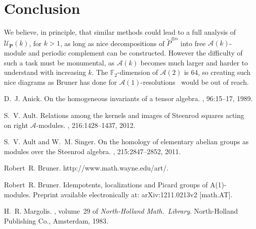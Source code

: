 \documentclass{amsart}
\theoremstyle{plain}
\theoremstyle{definition}
\theoremstyle{remark}
\begin{document}
\section{Conclusion}

We believe, in principle, that similar methods could lead to a full
analysis of $\mathcal{U}_{\mathbf{P}}(k)$, for $k > 1$, as long as
nice decompositions of $\widetilde{P}^{\otimes n}$ into free
$\mathcal{A}(k)$-module and periodic complement can be constructed.
However the difficulty of such a task must be monumental, as
$\mathcal{A}(k)$ becomes much larger and harder to understand with
increasing $k$.  The ${\mathbb{F}}_2$-dimension of $\mathcal{A}(2)$ is $64$, so
creating such nice diagrams as Bruner has done for
$\mathcal{A}(1)$-resolutions~\cite{Bruner_diagrams} would be out of
reach.



\begin{thebibliography}{1}

D.~J. Anick.
\newblock On the homogeneous invariants of a tensor algebra.
, 96:15--17, 1989.

S.~V. Ault.
\newblock Relations among the kernels and images of {S}teenrod squares acting
  on right $\mathcal{A}$-modules.
, 216:1428--1437, 2012.

S.~V. Ault and W.~M. Singer.
\newblock On the homology of elementary abelian groups as modules over the
  {S}teenrod algebra.
, 215:2847--2852, 2011.

Robert~R. Bruner.
\newblock http://www.math.wayne.edu/art/.

Robert~R. Bruner.
\newblock Idempotents, localizations and {P}icard groups of {A}(1)-modules.
\newblock Preprint available electronically at: arXiv:1211.0213v2 [math.AT].

H.~R. Margolis.
, volume~29 of {\em
  North-Holland Math.~Library}.
\newblock North-Holland Publishing Co., Amsterdam, 1983.

\end{thebibliography}
\end{document}
